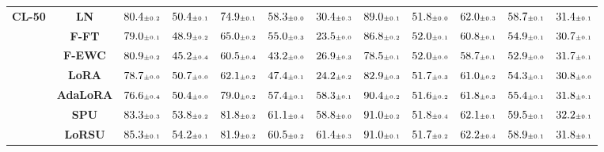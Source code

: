 \begin{table}
\begin{center}
\begin{small}
\begin{tabular}{l c c c c c c c c c c c}
\midrule
\multirow{7}{*}{\textbf{CL-50}} & \textbf{LN} & $80.4 \mtiny{\pm 0.2}$ & $50.4 \mtiny{\pm 0.1}$ & $74.9 \mtiny{\pm 0.1}$ & $58.3 \mtiny{\pm 0.0}$ & $30.4 \mtiny{\pm 0.3}$ & $89.0 \mtiny{\pm 0.1}$ & $51.8 \mtiny{\pm 0.0}$ & $62.0 \mtiny{\pm 0.3}$ & $58.7 \mtiny{\pm 0.1}$ & $31.4 \mtiny{\pm 0.1}$ \\
& \textbf{F-FT} & $79.0 \mtiny{\pm 0.1}$ & $48.9 \mtiny{\pm 0.2}$ & $65.0 \mtiny{\pm 0.2}$ & $55.0 \mtiny{\pm 0.3}$ & $23.5 \mtiny{\pm 0.0}$ & $86.8 \mtiny{\pm 0.2}$ & $52.0 \mtiny{\pm 0.1}$ & $60.8 \mtiny{\pm 0.1}$ & $54.9 \mtiny{\pm 0.1}$ & $30.7 \mtiny{\pm 0.1}$ \\
& \textbf{F-EWC} & $80.9 \mtiny{\pm 0.2}$ & $45.2 \mtiny{\pm 0.4}$ & $60.5 \mtiny{\pm 0.4}$ & $43.2 \mtiny{\pm 0.0}$ & $26.9 \mtiny{\pm 0.3}$ & $78.5 \mtiny{\pm 0.1}$ & $52.0 \mtiny{\pm 0.0}$ & $58.7 \mtiny{\pm 0.1}$ & $52.9 \mtiny{\pm 0.0}$ & $31.7 \mtiny{\pm 0.1}$ \\
& \textbf{LoRA} & $78.7 \mtiny{\pm 0.0}$ & $50.7 \mtiny{\pm 0.0}$ & $62.1 \mtiny{\pm 0.2}$ & $47.4 \mtiny{\pm 0.1}$ & $24.2 \mtiny{\pm 0.2}$ & $82.9 \mtiny{\pm 0.3}$ & $51.7 \mtiny{\pm 0.3}$ & $61.0 \mtiny{\pm 0.2}$ & $54.3 \mtiny{\pm 0.1}$ & $30.8 \mtiny{\pm 0.0}$ \\
& \textbf{AdaLoRA} & $76.6 \mtiny{\pm 0.4}$ & $50.4 \mtiny{\pm 0.0}$ & $79.0 \mtiny{\pm 0.2}$ & $57.4 \mtiny{\pm 0.1}$ & $58.3 \mtiny{\pm 0.1}$ & $90.4 \mtiny{\pm 0.2}$ & $51.6 \mtiny{\pm 0.2}$ & $61.8 \mtiny{\pm 0.3}$ & $55.4 \mtiny{\pm 0.1}$ & $31.8 \mtiny{\pm 0.1}$ \\
& \textbf{SPU} & $83.3 \mtiny{\pm 0.3}$ & $53.8 \mtiny{\pm 0.2}$ & $81.8 \mtiny{\pm 0.2}$ & $61.1 \mtiny{\pm 0.4}$ & $58.8 \mtiny{\pm 0.0}$ & $91.0 \mtiny{\pm 0.2}$ & $51.8 \mtiny{\pm 0.4}$ & $62.1 \mtiny{\pm 0.1}$ & $59.5 \mtiny{\pm 0.1}$ & $32.2 \mtiny{\pm 0.1}$ \\
& \textbf{LoRSU} & $85.3 \mtiny{\pm 0.1}$ & $54.2 \mtiny{\pm 0.1}$ & $81.9 \mtiny{\pm 0.2}$ & $60.5 \mtiny{\pm 0.2}$ & $61.4 \mtiny{\pm 0.3}$ & $91.0 \mtiny{\pm 0.1}$ & $51.7 \mtiny{\pm 0.2}$ & $62.2 \mtiny{\pm 0.4}$ & $58.9 \mtiny{\pm 0.1}$ & $31.8 \mtiny{\pm 0.1}$ \\
\bottomrule
\end{tabular}
\endgroup
\end{small}
\end{center}
\vskip -0.1in
\end{table}


